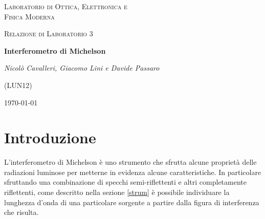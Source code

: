 \documentclass[a4paper,11pt]{article}
\begin{document}
	
	\begin{titlepage}
		\centering
		{\scshape\LARGE Laboratorio di Ottica, Elettronica e \\ Fisica Moderna \par}
		\vspace{1cm}
		{\scshape\Large Relazione di Laboratorio 3\par}
		\vspace{1.5cm}
		{\huge\bfseries Interferometro di Michelson\par}
		\vspace{2cm}
		
		{\Large\itshape Nicolò Cavalleri, Giacomo Lini e Davide Passaro
			
			(LUN12)}
		
		\vspace{5cm}
		\vfill
		
		\begin{abstract}
			Di seguito vengono riportate la procedura sperimentale, e l'analisi dei dati raccolti relativi a un esperimento compiuto con un Interferometro di Michelson. In particolare tramite il calcolo delle frange di interferenza dell'immagine prodotta viene determinata la lunghezza d'onda della luce emessa da un laser monocromatico. Altre grandezze fisiche rilevanti che questo apparato consente di mettere in evidenza sono l'indice di rifrazione dell'aria, la lunghezza dei pacchetti d'onda emessi da luce non monocromatica, e la differenza di lunghezza d'onda tra sorgenti differenti, nello specifico l'analisi è relativa al doppietto di sodio. Per ognuna di queste grandezze vengono riportate procedure sperimentali e risultati comprensivi di errore.
		\end{abstract}
		
		
		\vfill
		{\large \today\par}
		
	\end{titlepage}
	
	\newpage
	
	\section{Introduzione}
	L'interferometro di Michelson è uno strumento che sfrutta alcune proprietà  delle radiazioni luminose per metterne in evidenza alcune caratteristiche. In particolare sfruttando una combinazione di specchi semi-riflettenti e altri completamente riflettenti, come descritto nella sezione \ref{strum} è possibile individuare la lunghezza d'onda di una particolare sorgente a partire dalla figura di interferenza che risulta.	
	
\end{document}
